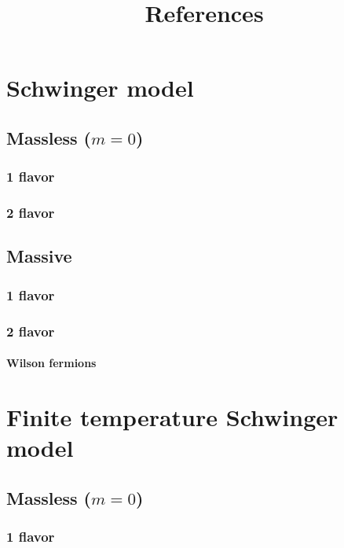 \documentclass[12pt,a4paper]{report}
\title{References}
\author{}
\begin{document}
\maketitle

\chapter{Schwinger model}

\section{Massless ($m = 0$)}

\subsection{1 flavor}

\subsection{2 flavor}

\section{Massive}

\subsection{1 flavor}

\subsection{2 flavor}

\subsubsection{Wilson fermions}


\chapter{Finite temperature Schwinger model}

\section{Massless ($m = 0$)}

\subsection{1 flavor}
\end{document}
